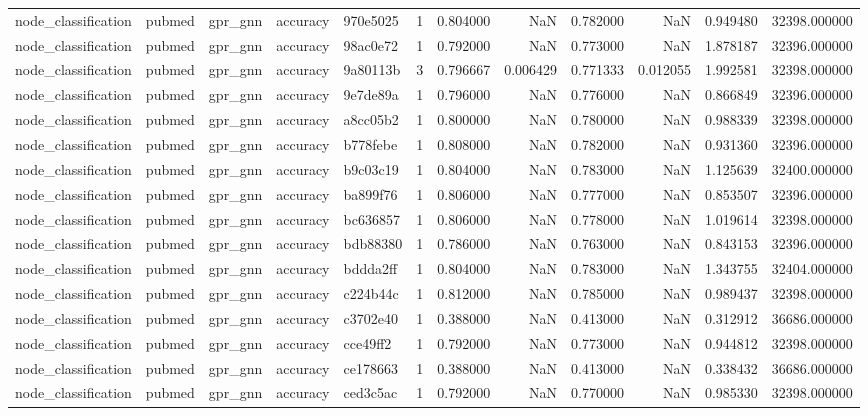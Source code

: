 \begin{tabular}{lllllrrrrrrr}
node_classification & pubmed & gpr_gnn & accuracy & 970e5025 & 1 & 0.804000 & NaN & 0.782000 & NaN & 0.949480 & 32398.000000 \\
node_classification & pubmed & gpr_gnn & accuracy & 98ac0e72 & 1 & 0.792000 & NaN & 0.773000 & NaN & 1.878187 & 32396.000000 \\
node_classification & pubmed & gpr_gnn & accuracy & 9a80113b & 3 & 0.796667 & 0.006429 & 0.771333 & 0.012055 & 1.992581 & 32398.000000 \\
node_classification & pubmed & gpr_gnn & accuracy & 9e7de89a & 1 & 0.796000 & NaN & 0.776000 & NaN & 0.866849 & 32396.000000 \\
node_classification & pubmed & gpr_gnn & accuracy & a8cc05b2 & 1 & 0.800000 & NaN & 0.780000 & NaN & 0.988339 & 32398.000000 \\
node_classification & pubmed & gpr_gnn & accuracy & b778febe & 1 & 0.808000 & NaN & 0.782000 & NaN & 0.931360 & 32396.000000 \\
node_classification & pubmed & gpr_gnn & accuracy & b9c03c19 & 1 & 0.804000 & NaN & 0.783000 & NaN & 1.125639 & 32400.000000 \\
node_classification & pubmed & gpr_gnn & accuracy & ba899f76 & 1 & 0.806000 & NaN & 0.777000 & NaN & 0.853507 & 32396.000000 \\
node_classification & pubmed & gpr_gnn & accuracy & bc636857 & 1 & 0.806000 & NaN & 0.778000 & NaN & 1.019614 & 32398.000000 \\
node_classification & pubmed & gpr_gnn & accuracy & bdb88380 & 1 & 0.786000 & NaN & 0.763000 & NaN & 0.843153 & 32396.000000 \\
node_classification & pubmed & gpr_gnn & accuracy & bddda2ff & 1 & 0.804000 & NaN & 0.783000 & NaN & 1.343755 & 32404.000000 \\
node_classification & pubmed & gpr_gnn & accuracy & c224b44c & 1 & 0.812000 & NaN & 0.785000 & NaN & 0.989437 & 32398.000000 \\
node_classification & pubmed & gpr_gnn & accuracy & c3702e40 & 1 & 0.388000 & NaN & 0.413000 & NaN & 0.312912 & 36686.000000 \\
node_classification & pubmed & gpr_gnn & accuracy & cce49ff2 & 1 & 0.792000 & NaN & 0.773000 & NaN & 0.944812 & 32398.000000 \\
node_classification & pubmed & gpr_gnn & accuracy & ce178663 & 1 & 0.388000 & NaN & 0.413000 & NaN & 0.338432 & 36686.000000 \\
node_classification & pubmed & gpr_gnn & accuracy & ced3c5ac & 1 & 0.792000 & NaN & 0.770000 & NaN & 0.985330 & 32398.000000 \\

\end{tabular}
